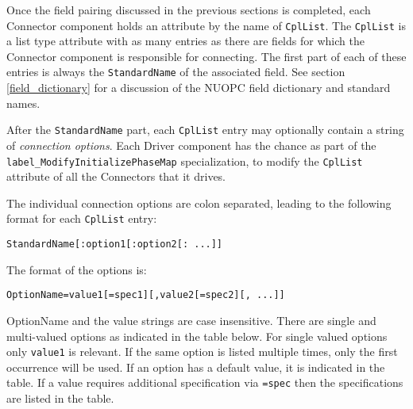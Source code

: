 %

\label{connection_options}

Once the field pairing discussed in the previous sections is completed, each Connector component holds an attribute by the name of {\tt CplList}. The {\tt CplList} is a list type attribute with as many entries as there are fields for which the Connector component is responsible for connecting. The first part of each of these entries is always the {\tt StandardName} of the associated field. See section \ref{field_dictionary} for a discussion of the NUOPC field dictionary and standard names.

After the {\tt StandardName} part, each {\tt CplList} entry may optionally contain a string of {\em connection options}. Each Driver component has the chance as part of the {\tt label\_ModifyInitializePhaseMap} specialization, to modify the {\tt CplList} attribute of all the Connectors that it drives.

The individual connection options are colon separated, leading to the following format for each {\tt CplList} entry:

\begin{verbatim}
StandardName[:option1[:option2[: ...]]
\end{verbatim}

The format of the options is:

\begin{verbatim}
OptionName=value1[=spec1][,value2[=spec2][, ...]]
\end{verbatim}

OptionName and the value strings are case insensitive. There are single and multi-valued options as indicated in the table below. For single valued options only {\tt value1} is relevant. If the same option is listed multiple times, only the first occurrence will be used. If an option has a default value, it is indicated in the table. If a value requires additional specification via {\tt =spec} then the specifications are listed in the table.

